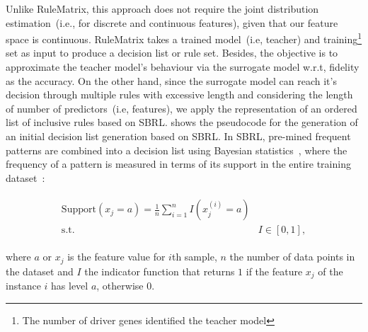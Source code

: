 \hspace*{3.5mm} Unlike RuleMatrix, this approach does not require the joint distribution estimation~(i.e., for discrete and continuous features), given that our feature space is continuous. RuleMatrix takes a trained model~(i.e, teacher) and training\footnote{The number of driver genes identified the teacher model} set as input to produce a decision list or rule set.
Besides, the objective is to approximate the teacher model's behaviour via the surrogate model w.r.t, fidelity as the accuracy. On the other hand, since the surrogate model can reach it's decision through multiple rules with excessive length and  
considering the length of number of predictors~(i.e, features), we apply the representation of an ordered list of inclusive rules based on SBRL.  shows the pseudocode for the generation of an initial decision list generation based on SBRL. In SBRL, pre-mined frequent patterns are combined into a decision list using Bayesian statistics~\cite{molnar2019interpretable}, where the frequency of a pattern is measured in terms of its support in the entire training dataset~\cite{molnar2019interpretable}:

\vspace{-6mm}
\begin{align}
    \begin{array}{cl}
        \text {Support}\left(x_{j}=a\right)=\frac{1}{n} \sum_{i=1}^{n} I\left(x_{j}^{(i)}=a\right) \\
         \text {s.t.} & I \in[0,1],
    \end{array}
    \label{eq:support_eq}
\end{align}

\hspace*{3.5mm} where $a$ or $x_j$ is the feature value for $i$th sample, $n$ the number of data points in the dataset and $I$ the indicator function that returns $1$ if the feature $x_{j}$ of the instance $i$ has level $a$, otherwise $0$. 

